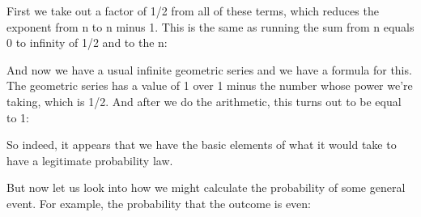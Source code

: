 \documentclass[pdftex, brazil, 12pt, twoside]{article}
\begin{document}
First we take out a factor of 1/2 from all of these terms,
which reduces the exponent from n to n minus 1.
This is the same as running the sum from n equals 0 to
infinity of 1/2 and to the n:

\begin{figure}[H]
  \begin{center}
  \end{center}
\end{figure}

And now we have a usual infinite geometric series and
we have a formula for this.
The geometric series has a value of 1 over 1 minus the
number whose power we're taking, which is 1/2.
And after we do the arithmetic, this turns out to
be equal to 1:

\begin{figure}[H]
  \begin{center}
  \end{center}
\end{figure}

So indeed, it appears that we have the basic elements of
what it would take to have a legitimate probability law.

But now let us look into how we might calculate the
probability of some general event.
For example, the probability that the outcome is even:

\begin{figure}[H]
  \begin{center}
  \end{center}
\end{figure}
\end{document}
